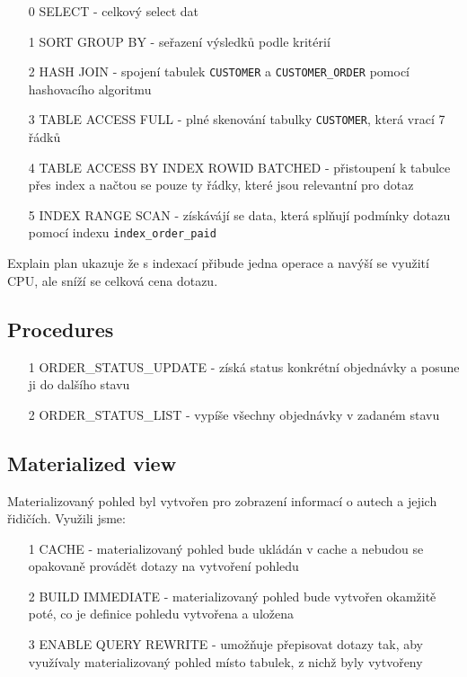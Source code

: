 \documentclass[a4paper, 12pt]{article}
\begin{document}
\begin{itemize}
    \item[0] SELECT - celkový select dat
    \item[1] SORT GROUP BY - seřazení výsledků podle kritérií
    \item[2] HASH JOIN - spojení tabulek \texttt{CUSTOMER} a \texttt{CUSTOMER\_ORDER} pomocí hashovacího algoritmu
    \item[3] TABLE ACCESS FULL - plné skenování tabulky \texttt{CUSTOMER}, která vrací 7 řádků
    \item[4] TABLE ACCESS BY INDEX ROWID BATCHED - přistoupení k tabulce přes index a načtou se pouze ty řádky, které jsou relevantní pro dotaz
    \item[5] INDEX RANGE SCAN - získávájí se data, která splňují podmínky dotazu pomocí indexu \texttt{index\_order\_paid}
\end{itemize}

Explain plan ukazuje že s indexací přibude jedna operace a navýší se využití CPU, ale sníží se celková cena dotazu.

\subsection{Procedures}
\begin{itemize}
    \item[1] ORDER\_STATUS\_UPDATE - získá status konkrétní objednávky a posune ji do dalšího stavu
    \item[2] ORDER\_STATUS\_LIST - vypíše všechny objednávky v zadaném stavu
\end{itemize}

\subsection{Materialized view}
Materializovaný pohled byl vytvořen pro zobrazení informací o autech a jejich řidičích.
Využili jsme: \begin{itemize}
    \item[1] CACHE - materializovaný pohled bude ukládán v cache a nebudou se opakovaně provádět dotazy na vytvoření pohledu
    \item[2] BUILD IMMEDIATE - materializovaný pohled bude vytvořen okamžitě poté, co je definice pohledu vytvořena a uložena
    \item[3] ENABLE QUERY REWRITE - umožňuje přepisovat dotazy tak, aby využívaly materializovaný pohled místo tabulek, z nichž byly vytvořeny
\end{itemize}
\end{document}
